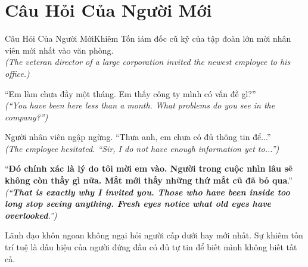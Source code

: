 \section{Câu Hỏi Của Người Mới}
\begin{truyen}{Câu Hỏi Của Người Mới}{Khiêm Tốn}
iám đốc cũ kỹ của tập đoàn lớn mời nhân viên mới nhất vào văn phòng.\\
\textit{(The veteran director of a large corporation invited the newest employee to his office.)}

``Em làm chưa đầy một tháng. Em thấy công ty mình có vấn đề gì?''\\
\textit{(``You have been here less than a month. What problems do you see in the company?'')}

Người nhân viên ngập ngừng. ``Thưa anh, em chưa có đủ thông tin để...''\\
\textit{(The employee hesitated. ``Sir, I do not have enough information yet to...'')}

``\textbf{Đó chính xác là lý do tôi mời em vào. Người trong cuộc nhìn lâu sẽ không còn thấy gì nữa. Mắt mới thấy những thứ mắt cũ đã bỏ qua}.''\\
\textit{(``\textbf{That is exactly why I invited you. Those who have been inside too long stop seeing anything. Fresh eyes notice what old eyes have overlooked}.'')}
\end{truyen}
\begin{baihoc}
  Lãnh đạo khôn ngoan không ngại hỏi người cấp dưới hay mới nhất. Sự khiêm tốn trí tuệ là dấu hiệu của người đứng đầu có đủ tự tin để biết mình không biết tất cả.
\end{baihoc}

